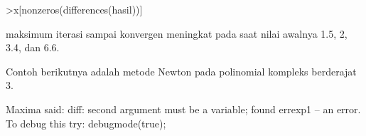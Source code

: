 \documentclass[a4paper,10pt]{article}
\begin{document}
\begin{eulernotebook}
\begin{eulercomment}
\begin{eulercomment}
\begin{eulercomment}
\begin{eulercomment}
\begin{eulercomment}
\begin{eulercomment}
\begin{euleroutput}
  [4,  5,  5,  5,  5,  5,  6,  6,  6,  6]
\end{euleroutput}
\begin{eulerprompt}
>x[nonzeros(differences(hasil))]
\end{eulerprompt}
\begin{euleroutput}
  [1.5,  2,  3.4,  6.6]
\end{euleroutput}
\begin{eulercomment}
maksimum iterasi sampai konvergen meningkat pada saat nilai awalnya 1.5, 2, 3.4, dan 6.6.

Contoh berikutnya adalah metode Newton pada polinomial kompleks berderajat 3.
\end{eulercomment}
\begin{euleroutput}
  Maxima said:
  diff: second argument must be a variable; found errexp1
   -- an error. To debug this try: debugmode(true);
  

\end{euleroutput}
\end{eulercomment}
\end{eulercomment}
\end{eulercomment}
\end{eulercomment}
\end{eulercomment}
\end{eulercomment}
\end{eulernotebook}
\end{document}
